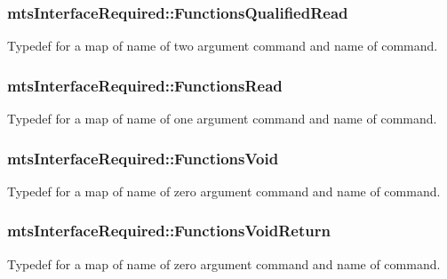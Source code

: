 \subsubsection[{Functions\+Qualified\+Read}]{ mts\+Interface\+Required\+::\+Functions\+Qualified\+Read\hspace{0.3cm}{\ttfamily [protected]}}\label{classmts_interface_required_abd2e0b70299b9a9a51cb7f3443d1364b}
Typedef for a map of name of two argument command and name of command. \hypertarget{classmts_interface_required_a0bbaaa1a252a893b921a02c61febf597}{}
\subsubsection[{Functions\+Read}]{ mts\+Interface\+Required\+::\+Functions\+Read\hspace{0.3cm}{\ttfamily [protected]}}\label{classmts_interface_required_a0bbaaa1a252a893b921a02c61febf597}
Typedef for a map of name of one argument command and name of command. \hypertarget{classmts_interface_required_ab2250cb695e1b187d6b4bbcc3a6cd73d}{}
\subsubsection[{Functions\+Void}]{ mts\+Interface\+Required\+::\+Functions\+Void\hspace{0.3cm}{\ttfamily [protected]}}\label{classmts_interface_required_ab2250cb695e1b187d6b4bbcc3a6cd73d}
Typedef for a map of name of zero argument command and name of command. \hypertarget{classmts_interface_required_a0588d79b2eca17da7ab9dfe9be6464f1}{}
\subsubsection[{Functions\+Void\+Return}]{ mts\+Interface\+Required\+::\+Functions\+Void\+Return\hspace{0.3cm}{\ttfamily [protected]}}\label{classmts_interface_required_a0588d79b2eca17da7ab9dfe9be6464f1}
Typedef for a map of name of zero argument command and name of command. \hypertarget{classmts_interface_required_af065f884f6aaac85d342b49bf6673528}{}
